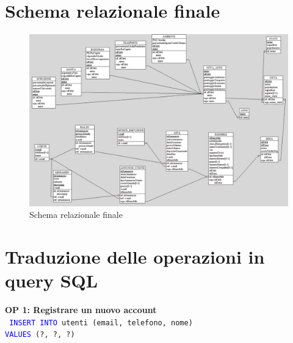 \documentclass[a4paper,12pt]{report}
\begin{document}
            \section{Schema relazionale finale}
                \begin{figure}[H]
                    \centering{}
                    \includegraphics[width=\linewidth]{./images/relational_scheme.png}
                    \caption{Schema relazionale finale}
            \end{figure}
                
            \section{Traduzione delle operazioni in query SQL}

            \textbf{OP 1: Registrare un nuovo account} \\
            \texttt{
                \textcolor{blue}{INSERT INTO} utenti (email, telefono, nome) \\
                \textcolor{blue}{VALUES} (?, ?, ?) \\
            } 
            
\end{document}
